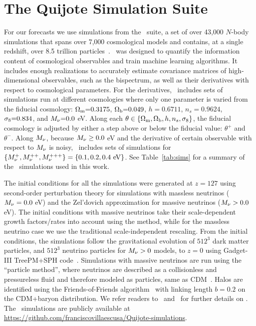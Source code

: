 \section{The Quijote Simulation Suite} \label{sec:sims}
For our forecasts we use simulations from the \quij~suite, a set of over 43,000 
$N$-body simulations that spans over 7,000 cosmological models and contains, at a single 
redshift, over 8.5 trillion particles~\citep{villaescusa-navarro2019}. 
\quij~was designed to quantify the information content of cosmological 
observables and train machine learning algorithms. It includes enough
realizations to accurately estimate covariance matrices 
of high-dimensional observables, such as the bispectrum, as well as their derivatives 
with respect to cosmological parameters. For the derivatives, 
\quij~includes sets of simulations run at different cosmologies where only 
one parameter is varied from the fiducial cosmology:
$\Omega_{\rm m}{=}0.3175$, $\Omega_{\rm b}{=}0.049$, $h{=}0.6711$, $n_s{=}0.9624$, $\sigma_8{=}0.834$, 
and $M_\nu{=}0.0$ eV. Along each $\theta \in \{\Omega_{\rm m}, \Omega_{\rm b}, h, n_s, \sigma_8\}$, the fiducial 
cosmology is adjusted by either a step above or below the fiducial value:
$\theta^{+}$ and $\theta^{-}$. 
Along $M_\nu$, because $M_\nu \ge 0.0$ eV and the derivative of certain observable 
with respect to $M_\nu$ is noisy, \quij~includes sets of simulations for 
$\{M_\nu^{+}, M_\nu^{++}, M_\nu^{+++} \} = \{0.1, 0.2, 0.4~{\rm eV}\}$. See 
Table~\ref{tab:sims} for a summary of the \quij~simulations used in this work. 

The initial conditions for all the simulations were generated at $z{=}127$ using 
second-order perturbation theory for simulations with massless neutrinos 
($M_\nu = 0.0$ eV) and the Zel’dovich approximation for massive neutrinos 
($M_\nu > 0.0$ eV). The initial conditions with massive neutrinos take 
their scale-dependent growth factors/rates into account using the 
\cite{zennaro2017a} method, while for the massless neutrino case we use 
the traditional scale-independent rescaling. From the initial conditions, 
the simulations follow the gravitational evolution of $512^3$ dark matter
particles, and $512^3$ neutrino particles for $M_\nu > 0$ models, to 
$z=0$ using {\sc Gadget-III} TreePM+SPH code~\citep{springel2005}. Simulations 
with massive neutrinos are run using the ``particle method'', where neutrinos 
are described as a collisionless and pressureless fluid and therefore modeled 
as particles, same as CDM~\citep{brandbyge2008,viel2010}. Halos are identified 
using the Friends-of-Friends algorithm~\citep[FoF;][]{davis1985} with linking
length $b=0.2$ on the CDM+baryon distribution. 
We refer readers to~\cite{villaescusa-navarro2019}
and~\cite{hahn2020} for further details on \quij. The
\quij~simulations are publicly available at
\url{https://github.com/franciscovillaescusa/Quijote-simulations}.
